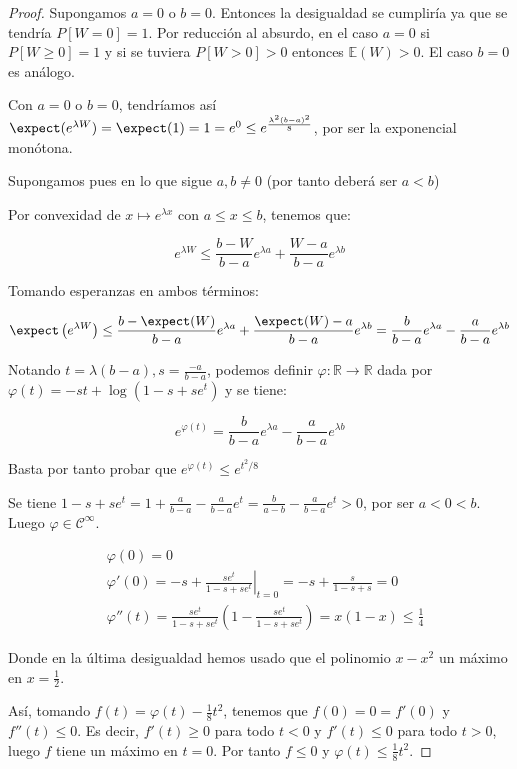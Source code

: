 \begin{proof}
 Supongamos $a=0$ o $b=0$. Entonces la desigualdad se cumpliría ya que se tendría $P[W=0]=1$. Por
 reducción al absurdo, en el caso $a=0$ si $P[W\ge 0] = 1$ y si se tuviera $P[W>0] > 0$ entonces $\mathbb{E}(W) > 0$.
 El caso $b=0$ es análogo.
 
 Con $a=0$ o $b=0$, tendríamos así $\expect(e^{\lambda W}) = \expect(1) = 1 = e^0 \le e^{\frac{\lambda^2 (b-a)^2}{8}}$, 
 por ser la exponencial monótona. 
 
 Supongamos pues en lo que sigue $a, b\neq 0$ (por tanto deberá ser $a < b$)
 
 Por convexidad de $x\mapsto e^{\lambda x}$ con $a\le x \le b$, tenemos que:
 
 \[e^{\lambda W} \le \frac{b-W}{b-a} e^{\lambda a} + \frac{W-a}{b-a}e^{\lambda b}\]

 Tomando esperanzas en ambos términos:
 
 \[\expect \left(e^{\lambda W}\right) \le \frac{b-\expect(W)}{b-a} e^{\lambda a} + 
   \frac{\expect(W)-a}{b-a}e^{\lambda b} = \frac{b}{b-a} e^{\lambda a} - \frac{a}{b-a} e^{\lambda b}\]
 
 Notando $t = \lambda(b-a), s = \frac{-a}{b-a}$, podemos definir $\varphi : \mathbb{R} \rightarrow \mathbb{R}$
 dada por $\varphi(t) = -st + \log(1-s+se^t)$ y se tiene:
 
 \[e^{\varphi(t)} = \frac{b}{b-a} e^{\lambda a} - \frac{a}{b-a} e^{\lambda b}\]
 
 Basta por tanto probar que $e^{\varphi(t)} \le e^{t^2/8}$
 
 Se tiene $1-s+se^t = 1 + \frac{a}{b-a} - \frac{a}{b-a} e^t = \frac{b}{a-b} - \frac{a}{b-a} e^t > 0$, por
 ser $a< 0 < b$. Luego $\varphi\in \mathcal{C}^{\infty}$.
 
 \begin{align*}
  &\varphi(0) = 0 \\  
  & \varphi'(0) = \left.-s + \frac{se^t}{1-s+se^t} \right|_{t=0} = -s + \frac{s}{1-s+s} = 0\\
  & \varphi''(t) = \frac{se^t}{1-s+se^t} \left(1-\frac{se^t}{1-s+se^t}\right) = x(1-x) \le \frac{1}{4}
 \end{align*}
 
 Donde en la última desigualdad hemos usado que el polinomio $x-x^2$ un máximo en $x=\frac{1}{2}$.
 
 Así, tomando $f(t) = \varphi(t) - \frac{1}{8}t^2$, tenemos que $f(0) = 0 = f'(0)$ y $f''(t) \le 0$. Es decir, 
 $f'(t) \ge 0$ para todo $t<0$ y $f'(t) \le 0$ para todo $t > 0$, luego $f$ tiene un máximo en $t=0$. Por tanto
 $f \le 0$ y $\varphi(t) \le \frac{1}{8} t^2$.
 \end{proof}


